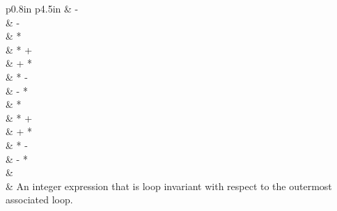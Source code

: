 \begin{ccppspecific}
\begin{supertabular}{ p{0.8in} p{4.5in}}
    & {} - {} \\
    & {} - {} \\
    & {} {*} {} \\
    & {} {*} {} + {} \\
    & {} + {} {*} {} \\
    & {} {*} {} - {} \\
    & {} - {} {*} {} \\
    & {} {*} {} \\
    & {} {*} {} + {} \\
    & {} + {} {*} {} \\
    & {} {*} {} - {} \\
    & {} - {} {*} {} \\
    & \\
    {} & An integer expression that is loop invariant with respect
    to the outermost associated loop.\\
\end{supertabular}
\medskip

\end{ccppspecific}

